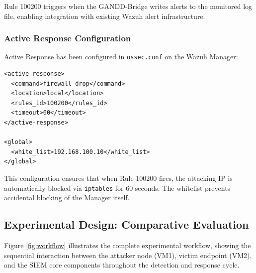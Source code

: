 Rule 100200 triggers when the GANDD-Bridge writes alerts to the monitored log file, enabling integration with existing Wazuh alert infrastructure.

\subsubsection{Active Response Configuration}

Active Response has been configured in \texttt{ossec.conf} on the Wazuh Manager:

\begin{verbatim}
<active-response>
  <command>firewall-drop</command>
  <location>local</location>
  <rules_id>100200</rules_id>
  <timeout>60</timeout>
</active-response>

<global>
  <white_list>192.168.100.10</white_list>
</global>
\end{verbatim}

This configuration ensures that when Rule 100200 fires, the attacking IP is automatically blocked via \texttt{iptables} for 60 seconds. The whitelist prevents accidental blocking of the Manager itself.

\subsection{Experimental Design: Comparative Evaluation}

Figure \ref{fig:workflow} illustrates the complete experimental workflow, showing the sequential interaction between the attacker node (VM1), victim endpoint (VM2), and the SIEM core components throughout the detection and response cycle.


